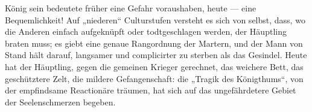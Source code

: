 König sein bedeutete früher eine Gefahr voraushaben, heute — eine Bequemlichkeit! Auf „niederen“ Culturstufen versteht es sich von selbst, dass, wo die Anderen einfach aufgeknüpft oder todtgeschlagen werden, der Häuptling braten muss; es giebt eine genaue Rangordnung der Martern, und der Mann von Stand hält darauf, langsamer und complicirter zu sterben als das Gesindel. Heute hat der Häuptling, gegen die gemeinen Krieger gerechnet, das weichere Bett, das geschütztere Zelt, die mildere Gefangenschaft: die „Tragik des Königthums“, von der empfindsame Reactionäre träumen, hat sich auf das ungefährdetere Gebiet der Seelenschmerzen begeben.
\par

